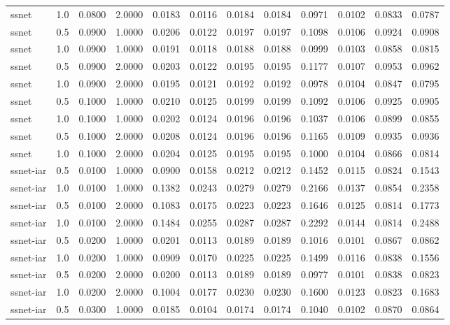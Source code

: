 \documentclass[
]{article}
\begin{document}
\begin{longtable}[]{@{}lrrrrrrrrrrr@{}}
ssnet & 1.0 & 0.0800 & 2.0000 & 0.0183 & 0.0116 & 0.0184 & 0.0184 &
0.0971 & 0.0102 & 0.0833 & 0.0787 \\
ssnet & 0.5 & 0.0900 & 1.0000 & 0.0206 & 0.0122 & 0.0197 & 0.0197 &
0.1098 & 0.0106 & 0.0924 & 0.0908 \\
ssnet & 1.0 & 0.0900 & 1.0000 & 0.0191 & 0.0118 & 0.0188 & 0.0188 &
0.0999 & 0.0103 & 0.0858 & 0.0815 \\
ssnet & 0.5 & 0.0900 & 2.0000 & 0.0203 & 0.0122 & 0.0195 & 0.0195 &
0.1177 & 0.0107 & 0.0953 & 0.0962 \\
ssnet & 1.0 & 0.0900 & 2.0000 & 0.0195 & 0.0121 & 0.0192 & 0.0192 &
0.0978 & 0.0104 & 0.0847 & 0.0795 \\
ssnet & 0.5 & 0.1000 & 1.0000 & 0.0210 & 0.0125 & 0.0199 & 0.0199 &
0.1092 & 0.0106 & 0.0925 & 0.0905 \\
ssnet & 1.0 & 0.1000 & 1.0000 & 0.0202 & 0.0124 & 0.0196 & 0.0196 &
0.1037 & 0.0106 & 0.0899 & 0.0855 \\
ssnet & 0.5 & 0.1000 & 2.0000 & 0.0208 & 0.0124 & 0.0196 & 0.0196 &
0.1165 & 0.0109 & 0.0935 & 0.0936 \\
ssnet & 1.0 & 0.1000 & 2.0000 & 0.0204 & 0.0125 & 0.0195 & 0.0195 &
0.1000 & 0.0104 & 0.0866 & 0.0814 \\
ssnet-iar & 0.5 & 0.0100 & 1.0000 & 0.0900 & 0.0158 & 0.0212 & 0.0212 &
0.1452 & 0.0115 & 0.0824 & 0.1543 \\
ssnet-iar & 1.0 & 0.0100 & 1.0000 & 0.1382 & 0.0243 & 0.0279 & 0.0279 &
0.2166 & 0.0137 & 0.0854 & 0.2358 \\
ssnet-iar & 0.5 & 0.0100 & 2.0000 & 0.1083 & 0.0175 & 0.0223 & 0.0223 &
0.1646 & 0.0125 & 0.0814 & 0.1773 \\
ssnet-iar & 1.0 & 0.0100 & 2.0000 & 0.1484 & 0.0255 & 0.0287 & 0.0287 &
0.2292 & 0.0144 & 0.0814 & 0.2488 \\
ssnet-iar & 0.5 & 0.0200 & 1.0000 & 0.0201 & 0.0113 & 0.0189 & 0.0189 &
0.1016 & 0.0101 & 0.0867 & 0.0862 \\
ssnet-iar & 1.0 & 0.0200 & 1.0000 & 0.0909 & 0.0170 & 0.0225 & 0.0225 &
0.1499 & 0.0116 & 0.0838 & 0.1556 \\
ssnet-iar & 0.5 & 0.0200 & 2.0000 & 0.0200 & 0.0113 & 0.0189 & 0.0189 &
0.0977 & 0.0101 & 0.0838 & 0.0823 \\
ssnet-iar & 1.0 & 0.0200 & 2.0000 & 0.1004 & 0.0177 & 0.0230 & 0.0230 &
0.1600 & 0.0123 & 0.0823 & 0.1683 \\
ssnet-iar & 0.5 & 0.0300 & 1.0000 & 0.0185 & 0.0104 & 0.0174 & 0.0174 &
0.1040 & 0.0102 & 0.0870 & 0.0864 \\

\end{longtable}
\end{document}
